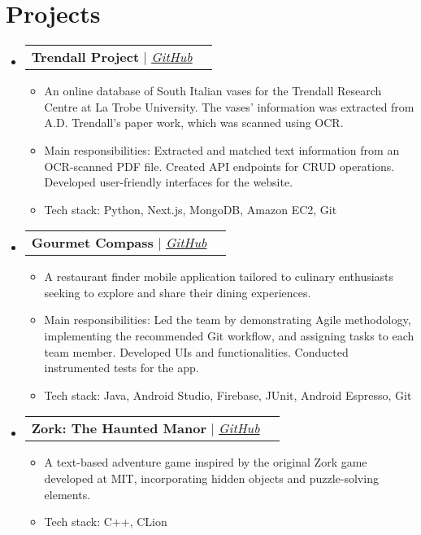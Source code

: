 \documentclass[letterpaper,11pt]{article}
\makeatletter
\newcommand{\resumeItem}[1]{
  \item\small{
    {#1 \vspace{-2pt}}
  }
}
\newcommand{\resumeProjectHeading}[2]{
    \vspace{-2pt}\item
    \begin{tabular*}{0.97\textwidth}{l@{\extracolsep{\fill}}r}
      \small#1 & #2 \\
    \end{tabular*}\vspace{-7pt}
}
\newcommand{\resumeSubHeadingListStart}{\begin{itemize}[leftmargin=0.15in, label={}]}
\newcommand{\resumeSubHeadingListEnd}{\end{itemize}}
\newcommand{\resumeItemListStart}{\begin{itemize}}
\newcommand{\resumeItemListEnd}{\end{itemize}\vspace{-5pt}}
\makeatother
\begin{document}
\section{Projects}
\vspace{3pt}
\resumeSubHeadingListStart

\resumeProjectHeading
{\textbf{Trendall Project} $|$ \emph{\href{https://github.com/Puppercino/trendall}{\color{blue}GitHub}}}{}
\resumeItemListStart
\resumeItem{An online database of South Italian vases for the Trendall Research Centre at La Trobe University. The vases' information was extracted from A.D. Trendall's paper work, which was scanned using OCR.}
\resumeItem{Main responsibilities: Extracted and matched text information from an OCR-scanned PDF file. Created API endpoints for CRUD operations. Developed user-friendly interfaces for the website.}
\resumeItem{Tech stack: Python, Next.js, MongoDB, Amazon EC2, Git}
\resumeItemListEnd

\resumeProjectHeading
{\textbf{Gourmet Compass} $|$ \emph{\href{https://github.com/vinhtocdo198/gourmet-compass.git}{\color{blue}GitHub}}}{}
\resumeItemListStart
\resumeItem{A restaurant finder mobile application tailored to culinary enthusiasts seeking to explore and share their dining experiences.}
\resumeItem{Main responsibilities: Led the team by demonstrating Agile methodology, implementing the recommended Git workflow, and assigning tasks to each team member. Developed UIs and functionalities. Conducted instrumented tests for the app.}
\resumeItem{Tech stack: Java, Android Studio, Firebase, JUnit, Android Espresso, Git}
\resumeItemListEnd

\resumeProjectHeading
{\textbf{Zork: The Haunted Manor} $|$ \emph{\href{https://github.com/vinhtocdo198/zork}{\color{blue}GitHub}}}{}
\resumeItemListStart
\resumeItem{A text-based adventure game inspired by the original Zork game developed at MIT, incorporating hidden objects and puzzle-solving elements.}
\resumeItem{Tech stack: C++, CLion}
\resumeItemListEnd

\resumeSubHeadingListEnd




\end{document}
